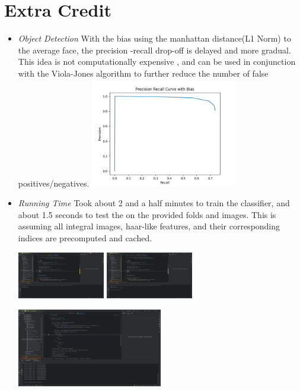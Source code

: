 \documentclass[11pt]{article}
\begin{document}
    \section{Extra Credit}

    \begin{itemize}
        \item \textit{Object Detection}\newline
        With the bias using the manhattan distance(L1 Norm) to the average face, the precision
        -recall drop-off is delayed and more gradual. This idea is not computationally expensive
        , and can be used in conjunction with the Viola-Jones algorithm to further reduce the
        number of false positives/negatives.\newline
        \includegraphics[width=0.5\textwidth]{Output Pictures/prc_knn}

        \item \textit{Running Time}\newline
        Took about 2 and a half minutes to train the classifier, and about 1.5 seconds to test
        the on the provided folds and images. This is assuming all integral images, haar-like
        features, and their corresponding indices are precomputed and cached.\newline
        \begin{center}
            \includegraphics[width=0.3\textwidth]{Output Pictures/training_start}
            \includegraphics[width=0.3\textwidth]{Output Pictures/training_finish}
        \end{center}
        \begin{center}
            \includegraphics[width=0.5\textwidth]{Output Pictures/testing_time}
        \end{center}


\end{itemize}
\end{document}
